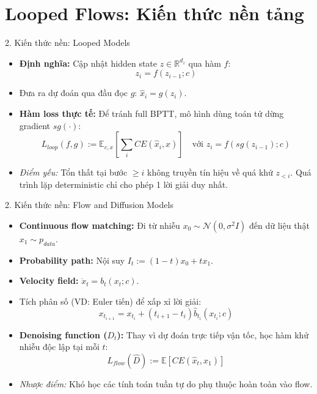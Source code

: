 \section{Looped Flows: Kiến thức nền tảng}
\begin{frame}{2. Kiến thức nền: Looped Models}
    \begin{itemize}
        \item \textbf{Định nghĩa:} Cập nhật hidden state $z \in \mathbb{R}^{d_z}$ qua hàm $f$:
        $$z_i = f(z_{i-1}; c)$$
        \item Đưa ra dự đoán qua đầu đọc $g$: $\hat{x}_i = g(z_i)$.
        \item \textbf{Hàm loss thực tế:} Để tránh full BPTT, mô hình dùng toán tử dừng gradient $sg(\cdot)$:
        $$L_{loop}(f, g) := \mathbb{E}_{c,x} \left[\sum_i CE(\hat{x}_i, x)\right] \quad \text{với } z_i = f(sg(z_{i-1}); c)$$
        \item \textit{Điểm yếu:} Tổn thất tại bước $\ge i$ không truyền tín hiệu về quá khứ $z_{<i}$. Quá trình lặp deterministic chỉ cho phép 1 lời giải duy nhất.
    \end{itemize}
\end{frame}

\begin{frame}{2. Kiến thức nền: Flow and Diffusion Models}
    \begin{itemize}
        \item \textbf{Continuous flow matching:} Đi từ nhiễu $x_0 \sim \mathcal{N}(0, \sigma^2 I)$ đến dữ liệu thật $x_1 \sim p_{data}$.
        \item \textbf{Probability path:} Nội suy $I_t := (1-t)x_0 + t x_1$.
        \item \textbf{Velocity field:} $\dot{x}_t = b_t(x_t; c)$.
        \item Tích phân số (VD: Euler tiến) để xấp xỉ lời giải:
        $$x_{t_{i+1}} = x_{t_i} + (t_{i+1} - t_i) \hat{b}_{t_i}(x_{t_i}; c)$$
        \item \textbf{Denoising function ($D_t$):} Thay vì dự đoán trực tiếp vận tốc, học hàm khử nhiễu độc lập tại mỗi $t$:
        $$L_{flow}(\hat{D}) := \mathbb{E}[CE(\hat{x}_t, x_1)]$$
        \item \textit{Nhược điểm:} Khó học các tính toán tuần tự do phụ thuộc hoàn toàn vào flow.
    \end{itemize}
\end{frame}

